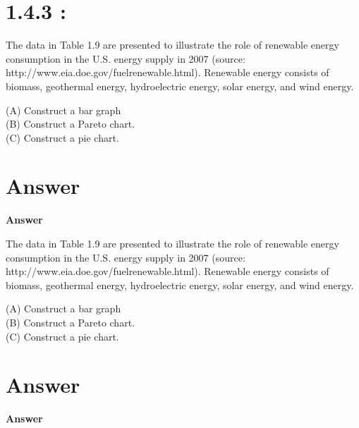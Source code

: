 \documentclass{article}
\begin{document}
\newpage

\section{{\huge 1.4.3 :}}

\begingroup

The data in Table 1.9 are presented to illustrate the role of renewable energy consumption in the U.S. energy supply
in 2007 (source: http://www.eia.doe.gov/fuelrenewable.html). Renewable energy consists of biomass, geothermal
energy, hydroelectric energy, solar energy, and wind energy.

\smallskip
\smallskip 
\textsc{(A)} Construct a bar graph \\
\textsc{(B)} Construct a Pareto chart.\\
\textsc{(C)} Construct a pie chart.

\endgroup

\newpage

\section*{Answer}

\begin{center}
    \textbf{\textbf{\huge{Answer}}}\\ 
\end{center}

\begingroup

The data in Table 1.9 are presented to illustrate the role of renewable energy consumption in the U.S. energy supply
in 2007 (source: http://www.eia.doe.gov/fuelrenewable.html). Renewable energy consists of biomass, geothermal
energy, hydroelectric energy, solar energy, and wind energy.

\smallskip
\smallskip 
\textsc{(A)} Construct a bar graph \\
\textsc{(B)} Construct a Pareto chart.\\
\textsc{(C)} Construct a pie chart.

\endgroup

\newpage

\section*{Answer}

\begin{center}
    \textbf{\textbf{\huge{Answer}}}\\ 
\end{center}
\end{document}
